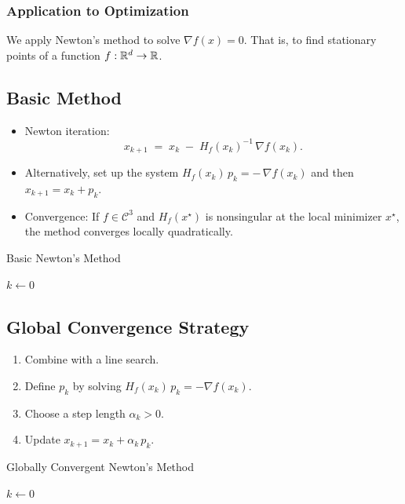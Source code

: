 \subsubsection*{Application to Optimization}

We apply Newton's method to solve \(\nabla f(x) = 0\). That is, to find stationary points of a function \(f:\mathbb{R}^d \to \mathbb{R}\).

\subsection*{Basic Method}
\begin{itemize}
  \item Newton iteration:
        \[
          x_{k+1} \;=\; x_k \;-\; H_f(x_k)^{-1} \,\nabla f(x_k).
        \]
  \item Alternatively, set up the system \(H_f(x_k)\,p_k = -\,\nabla f(x_k)\) and then \(x_{k+1} = x_k + p_k\).
  \item Convergence: If \(f\in \mathcal{C}^3\) and \(H_f(x^\star)\) is nonsingular at the local minimizer \(x^\star\), the method converges locally quadratically.
\end{itemize}

\begin{algorithm}[H]
  \caption{Basic Newton's Method}
  \label{alg:newton-basic}
  \(k \gets 0\)\;
  \;
\end{algorithm}

\subsection*{Global Convergence Strategy}
\begin{enumerate}
  \item Combine with a line search.
  \item Define \(p_k\) by solving \(H_f(x_k)\,p_k = -\nabla f(x_k)\).
  \item Choose a step length \(\alpha_k > 0\).
  \item Update \(x_{k+1} = x_k + \alpha_k \, p_k\).
\end{enumerate}

\begin{algorithm}[H]
  \caption{Globally Convergent Newton's Method}
  \label{alg:newton-global}
  \(k \gets 0\)\;
  \;
\end{algorithm}

